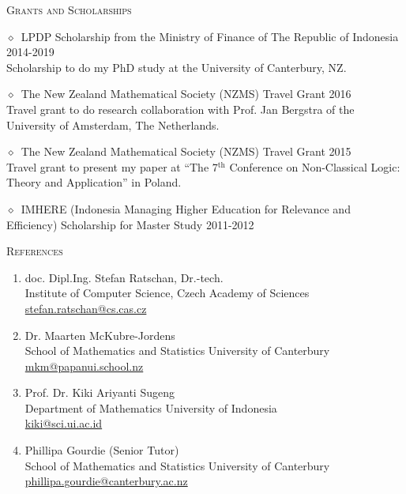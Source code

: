 \documentclass[11pt, a4paper]{article}
\newcommand{\smaller}[1]{{\small$\diamond$\ #1}}
\newcommand{\headright}[1]{\vspace*{2.5ex}\textsc{\Large\color{cvblue}#1}\par%
     \vspace*{-2ex}{\color{cvblue}\hrulefill}\par}
\begin{document}
\begin{minipage}[t]{0.56\textwidth}
\headright{Grants and Scholarships}
\smaller{LPDP Scholarship from the Ministry of Finance of The Republic of Indonesia 2014-2019}\\
Scholarship to do my PhD study at the University of Canterbury, NZ.

\smaller{The New Zealand Mathematical Society (NZMS) Travel Grant 2016}\\
Travel grant to do research collaboration with Prof. Jan Bergstra of the University of Amsterdam, The Netherlands. 

\smaller{The New Zealand Mathematical Society (NZMS) Travel Grant 2015}\\
Travel grant to present my paper at ``The 7$^\text{th}$ Conference on Non-Classical Logic:  Theory and Application'' in Poland. 

\smaller{IMHERE (Indonesia Managing Higher Education for Relevance and Efficiency) Scholarship for Master Study 2011-2012}


\headright{References}

\begin{enumerate}
    \item doc. Dipl.Ing. Stefan Ratschan, Dr.-tech. \\Institute of Computer Science, Czech Academy of Sciences\\
    \href{mailto:stefan.ratschan@cs.cas.cz}{stefan.ratschan@cs.cas.cz}
    \item Dr. Maarten McKubre-Jordens\\
    School of Mathematics and Statistics University of Canterbury\\
    \href{mailto:mkm@papanui.school.nz}{mkm@papanui.school.nz}
    \item Prof. Dr. Kiki Ariyanti Sugeng\\
    Department of Mathematics University of Indonesia\\
    \href{mailto:kiki@sci.ui.ac.id}{kiki@sci.ui.ac.id}
    \item Phillipa Gourdie (Senior Tutor)\\
    School of Mathematics and Statistics University of Canterbury\\
    \href{mailto:phillipa.gourdie@canterbury.ac.nz}{phillipa.gourdie@canterbury.ac.nz}

\end{enumerate}

\end{minipage}
\end{document}
